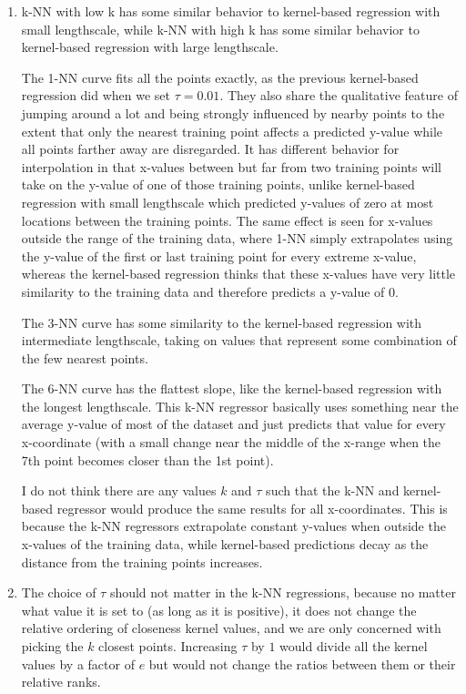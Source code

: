 \documentclass[submit]{harvardml}
\begin{document}
\begin{enumerate}
  
  
\item k-NN with low k has some similar behavior to kernel-based regression with small lengthscale, while k-NN with high k has some similar behavior to kernel-based regression with large lengthscale.
  
  The 1-NN curve fits all the points exactly, as the previous kernel-based regression did when we set $\tau=0.01$. They also share the qualitative feature of jumping around a lot and being strongly influenced by nearby points to the extent that only the nearest training point affects a predicted y-value while all points farther away are disregarded. It has different behavior for interpolation in that x-values between but far from two training points will take on the y-value of one of those training points, unlike kernel-based regression with small lengthscale which predicted y-values of zero at most locations between the training points. The same effect is seen for x-values outside the range of the training data, where 1-NN simply extrapolates using the y-value of the first or last training point for every extreme x-value, whereas the kernel-based regression thinks that these x-values have very little similarity to the training data and therefore predicts a y-value of 0.
  
  The 3-NN curve has some similarity to the kernel-based regression with intermediate lengthscale, taking on values that represent some combination of the few nearest points.
  
  The 6-NN curve has the flattest slope, like the kernel-based regression with the longest lengthscale. This k-NN regressor basically uses something near the average y-value of most of the dataset and just predicts that value for every x-coordinate (with a small change near the middle of the x-range when the 7th point becomes closer than the 1st point).
  
  I do not think there are any values $k$ and $\tau$ such that the k-NN and kernel-based regressor would produce the same results for all x-coordinates. This is because the k-NN regressors extrapolate constant y-values when outside the x-values of the training data, while kernel-based predictions decay as the distance from the training points increases.
  
\item The choice of $\tau$ should not matter in the k-NN regressions, because no matter what value it is set to (as long as it is positive), it does not change the relative ordering of closeness kernel values, and we are only concerned with picking the $k$ closest points. Increasing $\tau$ by $1$ would divide all the kernel values by a factor of $e$ but would not change the ratios between them or their relative ranks.

\end{enumerate}
\end{document}
